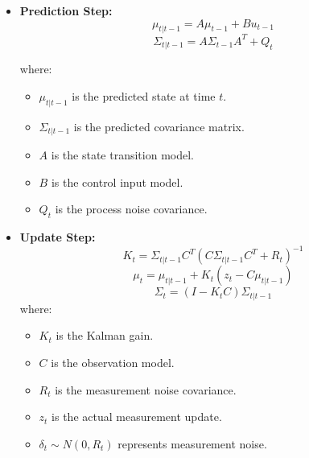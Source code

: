 \vspace{-0.2em}
\begin{itemize}
    \item \textbf{Prediction Step:}
    \begin{equation}
        \mu_{t|t-1} = A \mu_{t-1} + B u_{t-1}
    \end{equation}
    \vspace{-2.5em}
    \begin{equation}
        \Sigma_{t|t-1} = A \Sigma_{t-1} A^T + Q_t
    \end{equation}
    \vspace{-2.5em}
    
    where:
    \vspace{-0.3em}
    \begin{itemize}
        \item $\mu_{t|t-1}$ is the predicted state at time $t$.
        \item $\Sigma_{t|t-1}$ is the predicted covariance matrix.
        \item $A$ is the state transition model.
        \item $B$ is the control input model.
        \item $Q_t$ is the process noise covariance.
    \end{itemize}

    \item \textbf{Update Step:}
    \begin{equation}
        K_t = \Sigma_{t|t-1} C^T {\left(C \Sigma_{t|t-1} C^T + R_t\right)}^{-1}
    \end{equation}
    \vspace{-2.5em}
    \begin{equation}
        \mu_t = \mu_{t|t-1} + K_t (z_t - C \mu_{t|t-1})
    \end{equation}
    \vspace{-2.5em}
    \begin{equation}
        \Sigma_t = (I - K_t C) \Sigma_{t|t-1}
    \end{equation}
    \vspace{-1.5em}
    where:
    \vspace{0.5em}
    \begin{itemize}
        \item $K_t$ is the Kalman gain.
        \item $C$ is the observation model.
        \item $R_t$ is the measurement noise covariance.
        \item $z_t$ is the actual measurement update.
        \item $\delta_t \sim N(0, R_t)$ represents measurement noise.
    \end{itemize}
\end{itemize}

